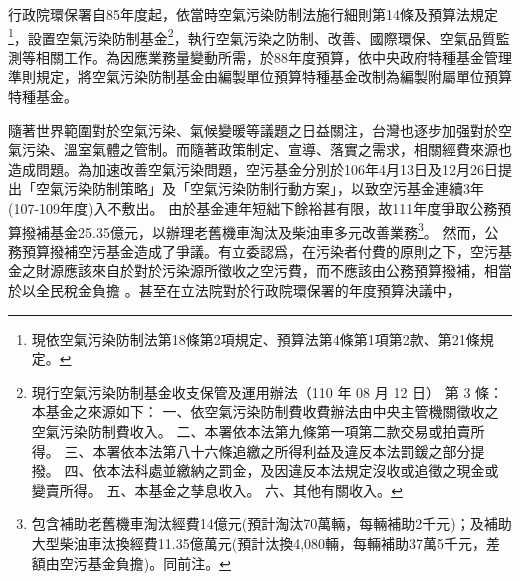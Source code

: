 \documentclass[12pt,a4paper]{article}
\begin{document}
行政院環保署自85年度起，依當時空氣污染防制法施行細則第14條及預算法規定\footnote{現依空氣污染防制法第18條第2項規定、預算法第4條第1項第2款、第21條規定。}，設置空氣污染防制基金\footnote{
  現行空氣污染防制基金收支保管及運用辦法（110 年 08 月 12 日）
  第 3 條：
本基金之來源如下：
一、依空氣污染防制費收費辦法由中央主管機關徵收之空氣污染防制費收入。
二、本署依本法第九條第一項第二款交易或拍賣所得。
三、本署依本法第八十六條追繳之所得利益及違反本法罰鍰之部分提撥。
四、依本法科處並繳納之罰金，及因違反本法規定沒收或追徵之現金或變賣所得。
五、本基金之孳息收入。
六、其他有關收入。}，執行空氣污染之防制、改善、國際環保、空氣品質監測等相關工作。為因應業務量變動所需，於88年度預算，依中央政府特種基金管理準則規定，將空氣污染防制基金由編製單位預算特種基金改制為編製附屬單位預算特種基金。


隨著世界範圍對於空氣污染、氣候變暖等議題之日益關注，台灣也逐步加强對於空氣污染、溫室氣體之管制。而隨著政策制定、宣導、落實之需求，相關經費來源也造成問題。為加速改善空氣污染問題，空污基金分別於106年4月13日及12月26日提出「空氣污染防制策略」及「空氣污染防制行動方案」，以致空污基金連續3年(107-109年度)入不敷出。
由於基金連年短絀下餘裕甚有限，故111年度爭取公務預算撥補基金25.35億元，以辦理老舊機車淘汰及柴油車多元改善業務\footnote{包含補助老舊機車淘汰經費14億元(預計淘汰70萬輛，每輛補助2千元)；及補助大型柴油車汰換經費11.35億萬元(預計汰換4,080輛，每輛補助37萬5千元，差額由空污基金負擔)。同前注。}。
然而，公務預算撥補空污基金造成了爭議。有立委認爲，在污染者付費的原則之下，空污基金之財源應該來自於對於污染源所徵收之空污費，而不應該由公務預算撥補，相當於以全民稅金負擔
。甚至在立法院對於行政院環保署的年度預算決議中，
\end{document}
